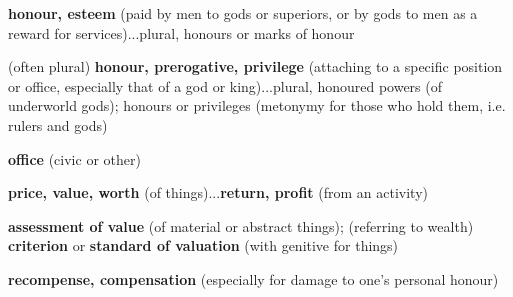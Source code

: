\begin{compactdesc}
					\item[CGL 1380a, PDF 1420] \textbf{}
						\begin{compactitem}
							\item[1] \textbf{honour, esteem} (paid by men to gods or superiors, or by gods to men as a reward for services)...plural, honours or marks of honour
							\item[2] (often plural) \textbf{honour, prerogative, privilege} (attaching to a specific position or office, especially that of a god or king)...plural, honoured powers (of underworld gods); honours or privileges (metonymy for those who hold them, i.e. rulers and gods)
							\item[3] \textbf{office} (civic or other)
							\item[4] \textbf{price, value, worth} (of things)...\textbf{return, profit} (from an activity)
							\item[5] \textbf{assessment of value} (of material or abstract things); (referring to wealth) \textbf{criterion} or \textbf{standard of valuation} (with genitive for things)
							\item[6] \textbf{recompense, compensation} (especially for damage to one's personal honour)
						\end{compactitem}
						

\end{compactdesc}
